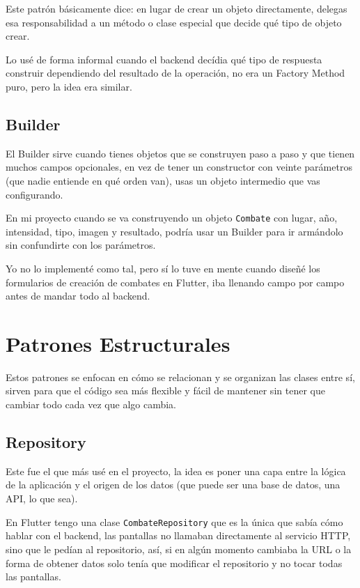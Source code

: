 \documentclass{article}
\begin{document}
Este patr\'on b\'asicamente dice: en lugar de crear un objeto directamente,
delegas esa responsabilidad a un m\'etodo o clase especial que decide qu\'e
tipo de objeto crear.


Lo us\'e de forma informal cuando el backend dec\'idia qu\'e tipo de respuesta
construir dependiendo del resultado de la operaci\'on, no era un Factory
Method puro, pero la idea era similar.

\subsection{Builder}

El Builder sirve cuando tienes objetos que se construyen paso a paso y
que tienen muchos campos opcionales, en vez de tener un constructor con
veinte par\'ametros (que nadie entiende en qu\'e orden van), usas un objeto
intermedio que vas configurando.

En mi proyecto cuando se va construyendo un objeto \texttt{Combate} con
lugar, a\~no, intensidad, tipo, imagen y resultado, podr\'ia usar un Builder
para ir arm\'andolo sin confundirte con los par\'ametros.

Yo no lo implement\'e como tal, pero s\'i lo tuve en mente cuando
dise\~n\'e los formularios de creaci\'on de combates en Flutter, iba llenando
campo por campo antes de mandar todo al backend.

\section{Patrones Estructurales}

Estos patrones se enfocan en c\'omo se relacionan y se organizan las clases
entre s\'i, sirven para que el c\'odigo sea m\'as flexible y f\'acil de mantener
sin tener que cambiar todo cada vez que algo cambia.

\subsection{Repository}

Este fue el que m\'as us\'e en el proyecto, la idea es poner una capa entre
la l\'ogica de la aplicaci\'on y el origen de los datos (que puede ser una
base de datos, una API, lo que sea).

En Flutter tengo una clase \texttt{CombateRepository} que es la \'unica
que sab\'ia c\'omo hablar con el backend, las pantallas no llamaban
directamente al servicio HTTP, sino que le ped\'ian al repositorio, as\'i,
si en alg\'un momento cambiaba la URL o la forma de obtener datos solo
ten\'ia que modificar el repositorio y no tocar todas las pantallas.
\end{document}
